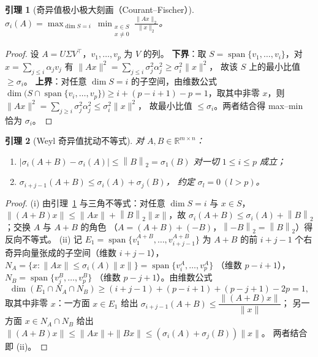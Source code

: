 \documentclass[UTF8,11pt,a4paper]{ctexart}
\theoremstyle{plain}
\newtheorem{lemma}{引理}
\theoremstyle{definition}
\theoremstyle{remark}
\newcommand{\R}{\mathbb{R}}
\newcommand{\Tnorm}[1]{\left\lVert #1\right\rVert_2}
\begin{document}
\begin{lemma}[奇异值极小极大刻画（Courant--Fischer）]\label{lem:minimax}
$\displaystyle\sigma_i(A)=\max_{\dim S=i}\ \min_{\substack{x\in S\\ x\ne0}}
\frac{\|Ax\|_2}{\|x\|_2}$。
\end{lemma}
\begin{proof}
设 $A=U\Sigma V^\top$，$v_1,\dots,v_p$ 为 $V$ 的列。
\textbf{下界}：取 $S=\operatorname{span}\{v_1,\dots,v_i\}$，对
$x=\sum_{j\le i}\alpha_jv_j$ 有
$\|Ax\|^2=\sum_{j\le i}\sigma_j^2\alpha_j^2\ge\sigma_i^2\|x\|^2$，
故该 $S$ 上的最小比值 $\ge\sigma_i$。
\textbf{上界}：对任意 $\dim S=i$ 的子空间，由维数公式
$\dim\big(S\cap\operatorname{span}\{v_i,\dots,v_p\}\big)
\ge i+(p-i+1)-p=1$，取其中非零 $x$，则
$\|Ax\|^2=\sum_{j\ge i}\sigma_j^2\alpha_j^2\le\sigma_i^2\|x\|^2$，
故最小比值 $\le\sigma_i$。两者结合得 max--min 恰为 $\sigma_i$。
\end{proof}

\begin{lemma}[Weyl 奇异值扰动不等式]\label{lem:weyl}
对 $A,B\in\R^{m\times n}$：
\begin{enumerate}
\item[(i)] $\big|\sigma_i(A+B)-\sigma_i(A)\big|\le\Tnorm{B}=\sigma_1(B)$
  对一切 $1\le i\le p$ 成立\cite{weyl1912,stewart1990}；
\item[(ii)] $\sigma_{i+j-1}(A+B)\le\sigma_i(A)+\sigma_j(B)$，
  约定 $\sigma_l=0\ (l>p)$。
\end{enumerate}
\end{lemma}
\begin{proof}
(i) 由引理~\ref{lem:minimax} 与三角不等式：对任意 $\dim S=i$ 与 $x\in S$，
$\|(A+B)x\|\le\|Ax\|+\Tnorm{B}\|x\|$，故
$\sigma_i(A+B)\le\sigma_i(A)+\Tnorm{B}$；交换 $A$ 与 $A+B$ 的角色
（$A=(A+B)+(-B)$，$\Tnorm{-B}=\Tnorm{B}$）得反向不等式。
(ii) 记 $E_1=\operatorname{span}\{v_1^{A+B},\dots,v_{i+j-1}^{A+B}\}$ 为
$A+B$ 的前 $i+j-1$ 个右奇异向量张成的子空间（维数 $i+j-1$），
$N_A=\{x:\|Ax\|\le\sigma_i(A)\|x\|\}=\operatorname{span}\{v_i^{A},\dots,v_p^{A}\}$
（维数 $p-i+1$），$N_B=\operatorname{span}\{v_j^{B},\dots,v_p^{B}\}$
（维数 $p-j+1$）。由维数公式
\[
\dim(E_1\cap N_A\cap N_B)\ge(i+j-1)+(p-i+1)+(p-j+1)-2p=1,
\]
取其中非零 $x$：一方面 $x\in E_1$ 给出
$\sigma_{i+j-1}(A+B)\le\dfrac{\|(A+B)x\|}{\|x\|}$；
另一方面 $x\in N_A\cap N_B$ 给出
$\|(A+B)x\|\le\|Ax\|+\|Bx\|\le(\sigma_i(A)+\sigma_j(B))\|x\|$。
两者结合即 (ii)。
\end{proof}
\end{document}
